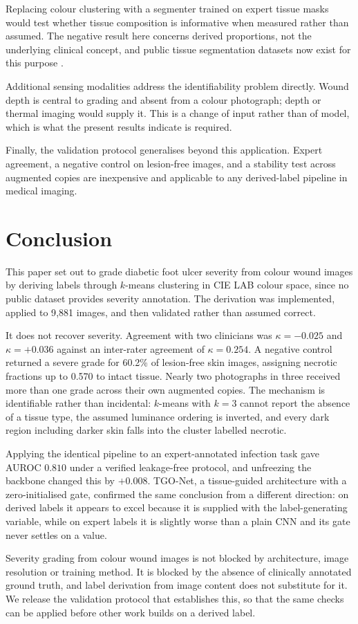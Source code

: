 Replacing colour clustering with a segmenter trained on expert tissue masks
would test whether tissue composition is informative when measured rather
than assumed. The negative result here concerns derived proportions, not
the underlying clinical concept, and public tissue segmentation datasets
now exist for this purpose \cite{dhar2024}.

Additional sensing modalities address the identifiability problem directly.
Wound depth is central to grading and absent from a colour photograph;
depth or thermal imaging would supply it. This is a change of input rather
than of model, which is what the present results indicate is required.

Finally, the validation protocol generalises beyond this application.
Expert agreement, a negative control on lesion-free images, and a stability
test across augmented copies are inexpensive and applicable to any
derived-label pipeline in medical imaging.

\section{Conclusion}

This paper set out to grade diabetic foot ulcer severity from colour wound
images by deriving labels through $k$-means clustering in CIE LAB colour
space, since no public dataset provides severity annotation. The derivation
was implemented, applied to 9{,}881 images, and then validated rather than
assumed correct.

It does not recover severity. Agreement with two clinicians was
$\kappa = -0.025$ and $\kappa = +0.036$ against an inter-rater agreement of
$\kappa = 0.254$. A negative control returned a severe grade for 60.2\% of
lesion-free skin images, assigning necrotic fractions up to 0.570 to intact
tissue. Nearly two photographs in three received more than one grade across
their own augmented copies. The mechanism is identifiable rather than
incidental: $k$-means with $k=3$ cannot report the absence of a tissue
type, the assumed luminance ordering is inverted, and every dark region
including darker skin falls into the cluster labelled necrotic.

Applying the identical pipeline to an expert-annotated infection task gave
AUROC $0.810$ under a verified leakage-free protocol, and unfreezing the
backbone changed this by $+0.008$. TGO-Net, a tissue-guided architecture
with a zero-initialised gate, confirmed the same conclusion from a
different direction: on derived labels it appears to excel because it is
supplied with the label-generating variable, while on expert labels it is
slightly worse than a plain CNN and its gate never settles on a value.

Severity grading from colour wound images is not blocked by architecture,
image resolution or training method. It is blocked by the absence of
clinically annotated ground truth, and label derivation from image content
does not substitute for it. We release the validation protocol that
establishes this, so that the same checks can be applied before other work
builds on a derived label.
